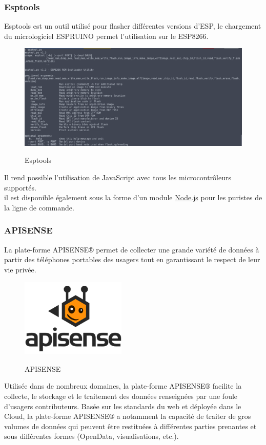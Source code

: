 \subsubsection{Esptools}
Esptools est un outil utilisé pour flasher différentes versions d’ESP, le chargement du micrologiciel ESPRUINO permet l'utilisation sur le ESP8266.\\
\begin{figure}[H]
  \centering
  \href{https://github.com/espressif/esptool}{
  \includegraphics[width=15cm]{image/esptools.png}
  }
  \caption{Esptools}
\end{figure}
Il rend possible l'utilisation de JavaScript avec tous les microcontrôleurs supportés.\\
il est disponible également sous la forme d'un module \href{https://www.npmjs.com/package/esptool}{Node.js} pour les puristes de la ligne de commande.

\subsubsection{APISENSE}
La plate-forme APISENSE® permet de collecter une grande variété de données à partir des téléphones portables des usagers tout en garantissant le respect de leur vie privée. 
\begin{figure}[H]
  \centering
  \href{https://www.inria.fr/centre/lille/innovation/rii/rii-technologies-du-web/demos/apisense-r-accedez-a-une-foule-de-donnees-en-2-clics}{
  \includegraphics[width=5cm]{image/apisense.png}
  }
  \caption{APISENSE}
\end{figure}

Utilisée dans de nombreux domaines, la plate-forme APISENSE® facilite la collecte, le stockage et le traitement des données renseignées par une foule d’usagers contributeurs. Basée sur les standards du web et déployée dans le Cloud, la plate-forme APISENSE® a notamment la capacité de traiter de gros volumes de données qui peuvent être restituées à différentes parties prenantes et sous différentes formes (OpenData, visualisations, etc.).



